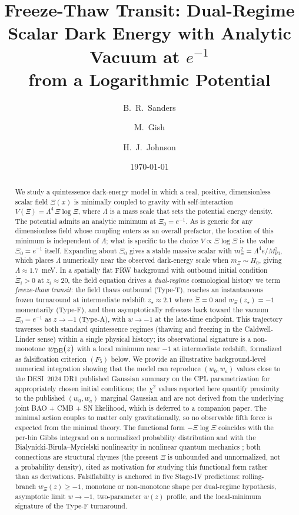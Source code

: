 \documentclass[11pt,reqno]{amsart}
\title[Freeze-Thaw Transit]{Freeze-Thaw Transit: Dual-Regime\\
Scalar Dark Energy with Analytic Vacuum at $e^{-1}$\\
from a Logarithmic Potential}
\author{B.~R.~Sanders}
\author{M.~Gish}
\author{H.~J.~Johnson}
\date{\today}
\theoremstyle{plain}
\theoremstyle{definition}
\theoremstyle{remark}
\newcommand{\Pl}{\mathrm{Pl}}
\begin{document}
\begin{abstract}
We study a quintessence dark-energy model in which a real, positive,
dimensionless scalar field $\Xi(x)$ is minimally coupled to gravity with
self-interaction $V(\Xi) = \Lambda^{4}\,\Xi\log\Xi$, where $\Lambda$ is a
mass scale that sets the potential energy density. The potential admits an
analytic minimum at $\Xi_0 = e^{-1}$. As is generic for any dimensionless
field whose coupling enters as an overall prefactor, the location of this
minimum is independent of $\Lambda$; what is specific to the choice
$V \propto \Xi\log\Xi$ is the value $\Xi_0 = e^{-1}$ itself. Expanding about
$\Xi_0$ gives a stable massive scalar with
$m_\Xi^{2} = \Lambda^{4} e / M_\Pl^{2}$, which places $\Lambda$ numerically
near the observed dark-energy scale when $m_\Xi \sim H_0$, giving
$\Lambda \approx 1.7$~meV. In a spatially flat FRW background with
outbound initial condition $\dot\Xi_i > 0$ at $z_i \approx 20$, the field
equation drives a \emph{dual-regime} cosmological history we term
\emph{freeze-thaw transit}: the field thaws outbound (Type-T), reaches
an instantaneous frozen turnaround at intermediate redshift $z_\star
\approx 2.1$ where $\dot\Xi = 0$ and $w_\Xi(z_\star) = -1$ momentarily
(Type-F), and then asymptotically refreezes back toward the vacuum
$\Xi_0 = e^{-1}$ as $z \to -1$ (Type-A), with $w \to -1$ at the late-time
endpoint. This trajectory traverses both standard quintessence regimes
(thawing and freezing in the Caldwell-Linder \cite{CaldwellLinder2005}
sense) within a single physical history; its observational signature is
a non-monotone $w_{\rm DE}(z)$ with a local minimum near $-1$ at
intermediate redshift, formalized as falsification criterion $(F_5)$
below. We provide an illustrative background-level numerical integration
showing that the model can reproduce $(w_0, w_a)$ values close to the
DESI~2024 DR1 published Gaussian summary on the CPL parametrization for
appropriately chosen initial conditions; the $\chi^{2}$ values reported
here quantify proximity to the published $(w_0, w_a)$ marginal Gaussian
and are not derived from the underlying joint BAO + CMB + SN likelihood,
which is deferred to a companion paper. The minimal action couples to
matter only gravitationally, so no observable fifth force is expected
from the minimal theory. The functional form $-\Xi\log\Xi$ coincides
with the per-bin Gibbs integrand on a normalized probability
distribution and with the Bialynicki-Birula--Mycielski nonlinearity in
nonlinear quantum mechanics \cite{BialynickiBirulaMycielski1976}; both
connections are structural rhymes (the present $\Xi$ is unbounded and
unnormalized, not a probability density), cited as motivation for
studying this functional form rather than as derivations.
Falsifiability is anchored in five Stage-IV predictions: rolling-branch
$w_\Xi(z) \geq -1$, monotone or non-monotone shape per dual-regime
hypothesis, asymptotic limit $w \to -1$, two-parameter $w(z)$ profile,
and the local-minimum signature of the Type-F turnaround.
\end{abstract}
\end{document}
